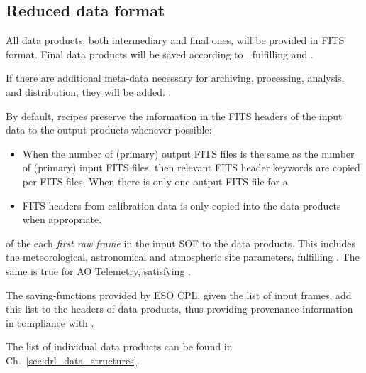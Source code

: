 %



\subsection{Reduced data format}
\label{ssec:reduced_data_format}

All data products, both intermediary and final ones, will be provided in FITS format. Final data products will be saved according to \cite{ESO-products_standard}, fulfilling  and .

If there are additional meta-data necessary for archiving, processing, analysis, and distribution, they will be added. .

By default, recipes preserve the information in the FITS headers of the input data to the output products whenever possible:
\begin{itemize}
\item When the number of (primary) output FITS files is the same as the number of (primary) input FITS files, then relevant FITS header keywords are copied per FITS files. When there is only one output FITS file for a 
\item FITS headers from calibration data is only copied into the data products when appropriate.
\end{itemize}
of the each  \emph{first raw frame} in
the input \ac{SOF} to the data products. This includes the meteorological,
astronomical and atmospheric site parameters, fulfilling . The same is true for \ac{AO} Telemetry, satisfying .

The saving-functions provided by ESO \ac{CPL}, given the list of input frames, add this list to the headers of data products, thus providing provenance information in compliance with .

The list of individual data products can be found in
Ch.~\ref{sec:drl_data_structures}.


